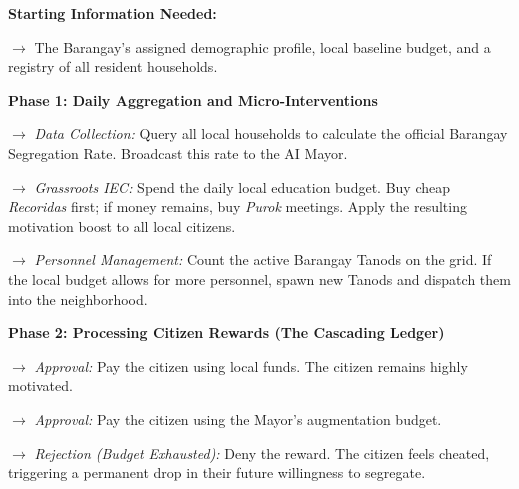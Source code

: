 \vspace{0.5cm} 
\begin{algorithm}[H]
\caption{The Barangay's Administrative and Fiscal Loop}
\label{alg:barangay_execution_english}
\begin{algorithmic}[1]
\State \textbf{Starting Information Needed:} 
\State \parbox[t]{0.9\linewidth}{$\rightarrow$ The Barangay's assigned demographic profile, local baseline budget, and a registry of all resident households.\strut}
\Statex
\State \textbf{Phase 1: Daily Aggregation and Micro-Interventions}
\State \parbox[t]{0.9\linewidth}{$\rightarrow$ \textit{Data Collection:} Query all local households to calculate the official Barangay Segregation Rate. Broadcast this rate to the AI Mayor.\strut}
\State \parbox[t]{0.9\linewidth}{$\rightarrow$ \textit{Grassroots IEC:} Spend the daily local education budget. Buy cheap \textit{Recoridas} first; if money remains, buy \textit{Purok} meetings. Apply the resulting motivation boost to all local citizens.\strut}
\State \parbox[t]{0.9\linewidth}{$\rightarrow$ \textit{Personnel Management:} Count the active Barangay Tanods on the grid. If the local budget allows for more personnel, spawn new Tanods and dispatch them into the neighborhood.\strut}
\Statex
\State \textbf{Phase 2: Processing Citizen Rewards (The Cascading Ledger)}
        \State \parbox[t]{0.85\linewidth}{$\rightarrow$ \textit{Approval:} Pay the citizen using local funds. The citizen remains highly motivated.\strut}
        \State \parbox[t]{0.85\linewidth}{$\rightarrow$ \textit{Approval:} Pay the citizen using the Mayor's augmentation budget.\strut}
    \Else
        \State \parbox[t]{0.85\linewidth}{$\rightarrow$ \textit{Rejection (Budget Exhausted):} Deny the reward. The citizen feels cheated, triggering a permanent drop in their future willingness to segregate.\strut}
    \EndIf
\EndIf
\end{algorithmic}
\end{algorithm}